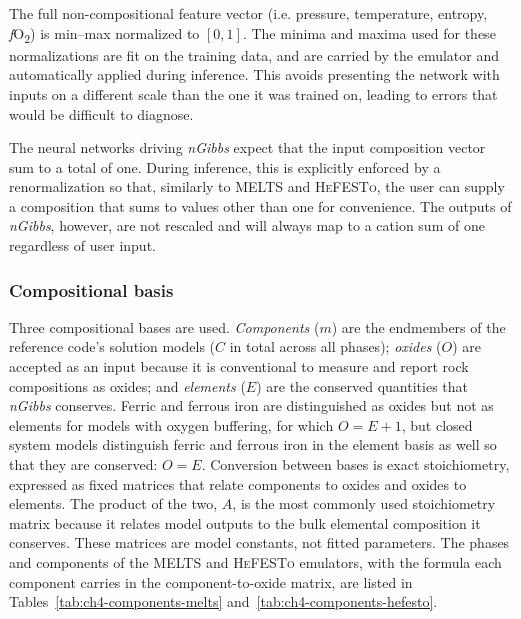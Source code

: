 The full non-compositional feature vector (i.e. pressure, temperature, entropy, \emph{f}O\textsubscript{2}) is min--max normalized to $[0,1]$. The minima and maxima used for these normalizations are fit on the
training data, and are carried by the emulator and automatically applied during inference.
This avoids presenting the network with inputs on a
different scale than the one it was trained on, leading to errors that would be difficult to diagnose.

The neural networks driving \emph{nGibbs} expect that the input composition vector sum to a total of one. 
During inference, this is explicitly enforced by a renormalization so that, similarly to \textsc{MELTS} and \textsc{HeFESTo}, 
the user can supply a composition that sums to values other than one for convenience. 
The outputs of \emph{nGibbs}, however, are not rescaled and will always map to a cation sum of one regardless of user input.


\subsubsection{Compositional basis}

Three compositional bases are used. \emph{Components} ($m$) are the endmembers of the reference code's
solution models ($C$ in total across all phases); \emph{oxides} ($O$) are accepted as an input
because it is conventional to measure and report rock compositions as oxides; and \emph{elements} ($E$) are the conserved
quantities that \emph{nGibbs} conserves. Ferric and ferrous iron are distinguished as oxides but not as
elements for models with oxygen buffering, for which $O = E+1$, but closed system models distinguish ferric and ferrous 
iron in the element basis as well so that they are conserved: $O = E$.  Conversion between bases is exact stoichiometry, expressed as
fixed matrices that relate components to oxides and oxides to elements. The product of the two, $A$, is the most commonly
used stoichiometry matrix because it relates model outputs to the bulk elemental composition it conserves. These matrices are model constants,
not fitted parameters. The phases and components of the \textsc{MELTS} and \textsc{HeFESTo} emulators, with the formula each component
carries in the component-to-oxide matrix, are listed in Tables~\ref{tab:ch4-components-melts} and~\ref{tab:ch4-components-hefesto}.




